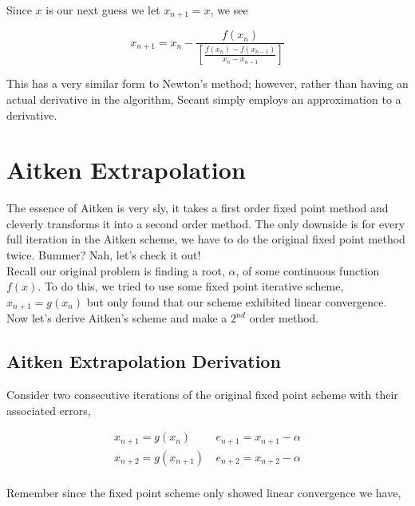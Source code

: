 \documentclass[paper=a4, fontsize=11pt]{scrartcl} %
\numberwithin{equation}{section} %
\numberwithin{figure}{section} %
\numberwithin{table}{section} %
\begin{document}
Since $x$ is our next guess we let $x_{n+1} = x$, we see

$$x_{n+1} = x_n - \frac{ f(x_n) }{  \left[\frac{f(x_n) - f(x_{n-1})}{x_n - x_{n-1}}\right]  }$$

This has a very similar form to Newton's method; however, rather than having an actual derivative in the algorithm, Secant simply employs an approximation to a derivative.











%
%

\section{Aitken Extrapolation}

The essence of Aitken is very sly, it takes a first order fixed point method and cleverly transforms it into a second order method. The only downside is for every full iteration in the Aitken scheme, we have to do the original fixed point method twice. Bummer? Nah, let's check it out! \\

Recall our original problem is finding a root, $\alpha$, of some continuous function $f(x)$. To do this, we tried to use some fixed point iterative scheme, $x_{n+1} = g(x_n)$ but only found that our scheme exhibited linear convergence. Now let's derive Aitken's scheme and make a $2^{nd}$ order method. \\

\subsection{Aitken Extrapolation Derivation}

Consider two consecutive iterations of the original fixed point scheme with their associated errors,

$$\begin{array}{cc}
x_{n+1}=g(x_n) & \ e_{n+1}=x_{n+1}-\alpha \\
x_{n+2}=g(x_{n+1}) & \ e_{n+2}=x_{n+2}-\alpha \\
\end{array}$$

Remember since the fixed point scheme only showed linear convergence we have,
\end{document}
